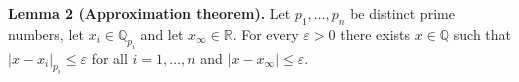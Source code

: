 \textbf{Lemma 2 (Approximation theorem).} Let $p_1, \ldots, p_n$ be distinct prime numbers, let $x_i \in \mathbb{Q}_{p_i}$ and let $x_\infty \in \mathbb{R}$. For every $\varepsilon > 0$ there exists $x \in \mathbb{Q}$ such that $|x - x_i|_{p_i} \leq \varepsilon$ for all $i = 1, \ldots, n$ and $|x - x_\infty| \leq \varepsilon$.
